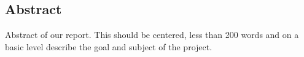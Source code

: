 \begin{center}
\section*{Abstract}

Abstract of our report.
This should be centered, less than 200 words and on a basic level describe the goal and subject of the  project.
\end{center}



\newpage